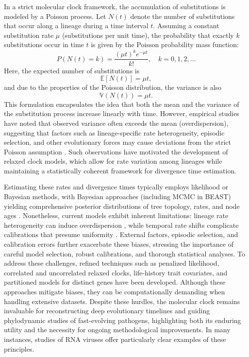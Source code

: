 In a strict molecular clock framework, the accumulation of substitutions is modeled by a Poisson process. Let $N(t)$ denote the number of substitutions that occur along a lineage during a time interval $t$. Assuming a constant substitution rate $\mu$ (substitutions per unit time), the probability that exactly $k$ substitutions occur in time $t$ is given by the Poisson probability mass function:
$$
P\left(N(t) = k\right) = \frac{(\mu t)^k e^{-\mu t}}{k!}, \quad k = 0, 1, 2, \dots
$$
Here, the expected number of substitutions is
$$
\mathbb{E}[N(t)] = \mu t,
$$
and due to the properties of the Poisson distribution, the variance is also
$$
\mathbb{V}(N(t)) = \mu t.
$$
This formulation encapsulates the idea that both the mean and the variance of the substitution process increase linearly with time. However, empirical studies have noted that observed variance often exceeds the mean (overdispersion), suggesting that factors such as lineage-specific rate heterogeneity, episodic selection, and other evolutionary forces may cause deviations from the strict Poisson assumption \cite{Gillespie1984, Ho2011}. Such observations have motivated the development of relaxed clock models, which allow for rate variation among lineages while maintaining a statistically coherent framework for divergence time estimation.

Estimating these rates and divergence times typically employs likelihood or Bayesian methods, with Bayesian approaches (including MCMC in BEAST) yielding comprehensive posterior distributions of tree topology, rates, and node ages \cite{Kumar2016}. Nonetheless, current models exhibit inherent limitations: lineage rate heterogeneity can induce overdispersion \cite{Gillespie1984}, while temporal rate shifts complicate calibrations that presume uniformity \cite{Ho2011}. External factors, episodic selection, and calibration errors further exacerbate these biases, stressing the importance of careful model selection, robust calibrations, and thorough statistical analyses. To address these challenges, refined techniques such as penalized likelihood, correlated and uncorrelated relaxed clocks, life-history trait covariates, and partitioned models for distinct genes have been developed. Although these approaches mitigate biases, they can be computationally demanding when handling extensive datasets. Despite these hurdles, the molecular clock remains invaluable for reconstructing deep evolutionary timelines and guiding phylodynamic studies of fast-evolving pathogens, highlighting both its enduring utility and the necessity for ongoing methodological improvements. In many instances, studies of RNA viruses offer particularly clear examples of these principles.


